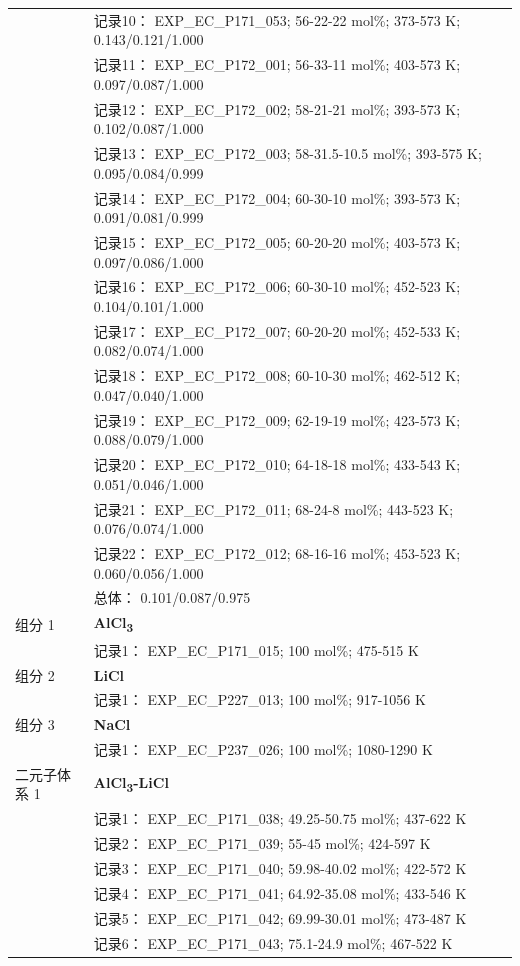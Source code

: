 \documentclass[12pt]{article}
\begin{document}
{\begin{longtable}[]{@{}
  >{\raggedright\arraybackslash}p{}
  >{\raggedright\arraybackslash}p{}@{}}
 & 记录10： EXP\_EC\_P171\_053; 56-22-22 mol\%; 373-573 K; 0.143/0.121/1.000 \\
 & 记录11： EXP\_EC\_P172\_001; 56-33-11 mol\%; 403-573 K; 0.097/0.087/1.000 \\
 & 记录12： EXP\_EC\_P172\_002; 58-21-21 mol\%; 393-573 K; 0.102/0.087/1.000 \\
 & 记录13： EXP\_EC\_P172\_003; 58-31.5-10.5 mol\%; 393-575 K; 0.095/0.084/0.999 \\
 & 记录14： EXP\_EC\_P172\_004; 60-30-10 mol\%; 393-573 K; 0.091/0.081/0.999 \\
 & 记录15： EXP\_EC\_P172\_005; 60-20-20 mol\%; 403-573 K; 0.097/0.086/1.000 \\
 & 记录16： EXP\_EC\_P172\_006; 60-30-10 mol\%; 452-523 K; 0.104/0.101/1.000 \\
 & 记录17： EXP\_EC\_P172\_007; 60-20-20 mol\%; 452-533 K; 0.082/0.074/1.000 \\
 & 记录18： EXP\_EC\_P172\_008; 60-10-30 mol\%; 462-512 K; 0.047/0.040/1.000 \\
 & 记录19： EXP\_EC\_P172\_009; 62-19-19 mol\%; 423-573 K; 0.088/0.079/1.000 \\
 & 记录20： EXP\_EC\_P172\_010; 64-18-18 mol\%; 433-543 K; 0.051/0.046/1.000 \\
 & 记录21： EXP\_EC\_P172\_011; 68-24-8 mol\%; 443-523 K; 0.076/0.074/1.000 \\
 & 记录22： EXP\_EC\_P172\_012; 68-16-16 mol\%; 453-523 K; 0.060/0.056/1.000 \\
 & 总体： 0.101/0.087/0.975  \\

组分 1  & \textbf{AlCl\textsubscript{3}} \\
 & 记录1： EXP\_EC\_P171\_015; 100 mol\%; 475-515 K  \\

组分 2  & \textbf{LiCl} \\
 & 记录1： EXP\_EC\_P227\_013; 100 mol\%; 917-1056 K  \\

组分 3  & \textbf{NaCl} \\
 & 记录1： EXP\_EC\_P237\_026; 100 mol\%; 1080-1290 K  \\

二元子体系 1  & \textbf{AlCl\textsubscript{3}-LiCl} \\
 & 记录1： EXP\_EC\_P171\_038; 49.25-50.75 mol\%; 437-622 K \\
 & 记录2： EXP\_EC\_P171\_039; 55-45 mol\%; 424-597 K \\
 & 记录3： EXP\_EC\_P171\_040; 59.98-40.02 mol\%; 422-572 K \\
 & 记录4： EXP\_EC\_P171\_041; 64.92-35.08 mol\%; 433-546 K \\
 & 记录5： EXP\_EC\_P171\_042; 69.99-30.01 mol\%; 473-487 K \\
 & 记录6： EXP\_EC\_P171\_043; 75.1-24.9 mol\%; 467-522 K  \\


\end{longtable}}
\end{document}
